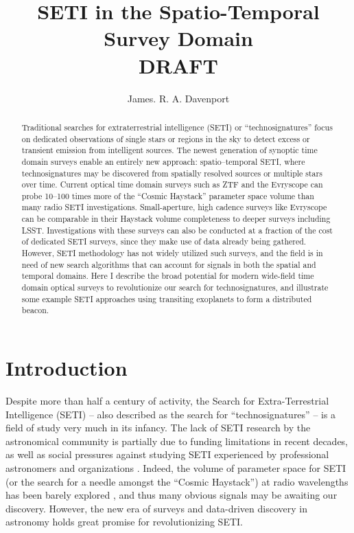 \documentclass[twocolumn]{aastex62}
\begin{document}
\title{SETI in the Spatio-Temporal Survey Domain \\
{\color{red} {\bf DRAFT} }
}



\author{James. R. A. Davenport}


\begin{abstract}
Traditional searches for extraterrestrial intelligence (SETI) or ``technosignatures'' focus on dedicated observations of single stars or regions in the sky to detect excess or transient emission from intelligent sources. The newest generation of synoptic time domain surveys enable an entirely new approach: spatio--temporal SETI, where technosignatures may be discovered from spatially resolved sources or multiple stars over time. 
Current optical time domain surveys such as ZTF and the Evryscope can probe 10--100 times more of the ``Cosmic Haystack'' parameter space volume than many radio SETI investigations. Small-aperture, high cadence surveys like Evryscope can be comparable in their Haystack volume completeness to deeper surveys including LSST. Investigations with these surveys can also be conducted at a fraction of the cost of dedicated SETI surveys, since they make use of data already being gathered. 
However, SETI methodology has not widely utilized such surveys, and the field is in need of new search algorithms that can account for signals in both the spatial and temporal domains.
Here I describe the broad potential for modern wide-field time domain optical surveys to revolutionize our search for technosignatures, and illustrate some example SETI approaches using transiting exoplanets to form a distributed beacon.
\end{abstract}


\section{Introduction}

Despite more than half a century of activity, the Search for Extra-Terrestrial Intelligence (SETI) -- also described as the search for ``technosignatures'' -- is a field of study very much in its infancy. 
The lack of SETI research by the astronomical community is partially due to funding limitations in recent decades, as well as social pressures against studying SETI experienced by professional astronomers and organizations \citep{wright2018b}. 
Indeed, the volume of parameter space for SETI (or the search for a needle amongst the ``Cosmic Haystack'') at radio wavelengths has been barely explored \citet{wright2018c}, and thus many obvious signals may be awaiting our discovery. 
However, the new era of surveys and data-driven discovery in astronomy holds great promise for revolutionizing SETI.
\end{document}
